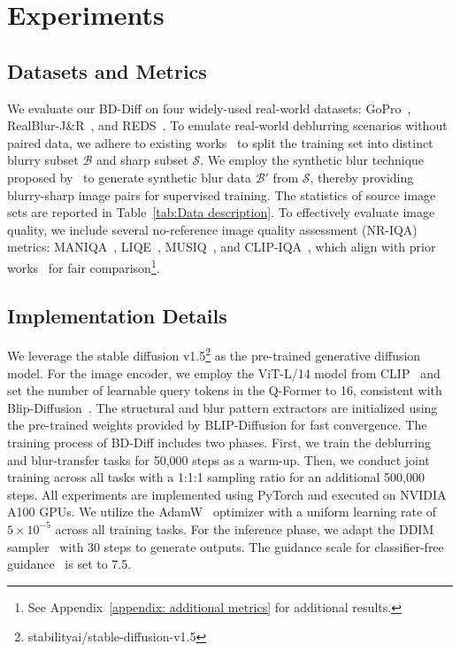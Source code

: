 \section{Experiments}
\label{sec:exp}
\subsection{Datasets and Metrics}

We evaluate our BD-Diff on four widely-used real-world datasets: GoPro~\cite{nah2017deep}, RealBlur-J\&R~\cite{rim2020real}, and REDS~\cite{nah2019ntire}. To emulate real-world deblurring scenarios without paired data, we adhere to existing works~\cite{pham2024blur2blur} to split the training set into distinct blurry subset $\mathcal{B}$ and sharp subset $\mathcal{S}$. We employ the synthetic blur technique proposed by~\cite{rim2020real} to generate synthetic blur data $\mathcal{B'}$ from $\mathcal{S}$, thereby providing blurry-sharp image pairs for supervised training. The statistics of source image sets are reported in Table~\ref{tab:Data description}. To effectively evaluate image quality, we include several no-reference image quality assessment (NR-IQA) metrics: MANIQA~\cite{yang2022maniqa}, LIQE~\cite{zhang2023blind}, MUSIQ~\cite{ke2021musiq}, and CLIP-IQA~\cite{wang2023exploring}, which align with prior works~\cite{lin2025diffbir,zhang2024diff} for fair comparison\footnote{See Appendix~\ref{appendix: additional metrics} for additional results.}.

\subsection{Implementation Details}
\label{sec:details}


We leverage the stable diffusion v1.5\footnote{stabilityai/stable-diffusion-v1.5} as the pre-trained generative diffusion model. For the image encoder, we employ the ViT-L/14 model from CLIP~\cite{radford2021learning} and set the number of learnable query tokens in the Q-Former to 16, consistent with Blip-Diffusion~\cite{li2024blip}. The structural and blur pattern extractors are initialized using the pre-trained weights provided by BLIP-Diffusion for fast convergence. The training process of BD-Diff includes two phases. First, we train the deblurring and blur-transfer tasks for 50,000 steps as a warm-up. Then, we conduct joint training across all tasks with a 1:1:1 sampling ratio for an additional 500,000 steps. All experiments are implemented using PyTorch and executed on NVIDIA A100 GPUs. We utilize the AdamW~\cite{loshchilov2017decoupled} optimizer with a uniform learning rate of $5 \times 10^{-5}$ across all training tasks. For the inference phase, we adapt the DDIM sampler~\cite{Song_Meng_Ermon_2020} with 30 steps to generate outputs. The guidance scale for classifier-free guidance~\cite{ho2022classifier} is set to 7.5.

